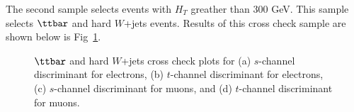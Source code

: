 The second sample selects events with $H_{T}$ greather than $300$
GeV. This sample selects $\ttbar$ and hard $W$+jets events. Results of this cross check sample are shown below is 
Fig~\ref{ttbar_cross}.
\vspace{0.1in}
\begin{figure}[!h!tbp]
\begin{center}
\end{center}
\vspace{-0.1in}
\caption{$\ttbar$ and hard $W$+jets cross check plots for (a) $s$-channel discriminant for electrons,
(b) $t$-channel discriminant for electrons, (c) $s$-channel discriminant for muons,
and (d) $t$-channel discriminant for muons.}
\label{ttbar_cross}
\end{figure}




